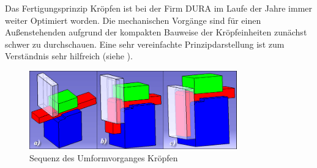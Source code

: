 \documentclass[12pt,a4paper,parskip]{scrartcl}
\begin{document}
Das Fertigungsprinzip Kröpfen  ist bei der Firm DURA im  Laufe der Jahre immer weiter Optimiert worden. Die mechanischen Vorgänge sind für einen Außenstehenden aufgrund der kompakten Bauweise der Kröpfeinheiten zunächst schwer zu durchschauen. Eine sehr vereinfachte Prinzipdarstellung ist zum Verständnis sehr hilfreich (siehe ).\\
\begin{figure}[hbtp]
\centering
\includegraphics[width=0.8\textwidth]{krpfsequenz}
\caption{Sequenz des Umformvorganges Kröpfen}
\label{fig:krpfprinz}
\end{figure}
\end{document}
